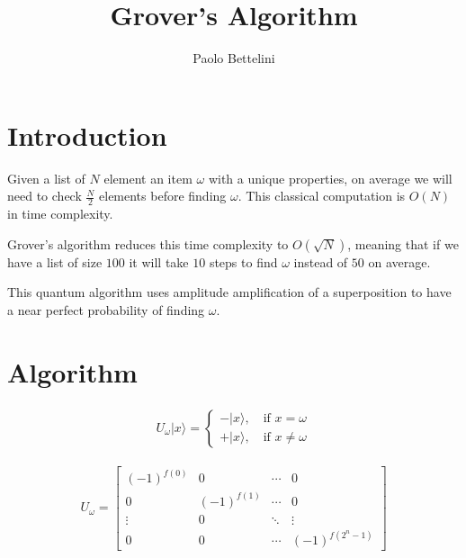 \documentclass{article}
\title{Grover's Algorithm}
\author{Paolo Bettelini}
\date{}
\begin{document}
\maketitle
\tableofcontents
\pagebreak

\section{Introduction}

Given a list of \(N\) element an item \(\omega\) with a unique properties, on average we will need to check \(\frac{N}{2}\) elements before finding \(\omega\).
This classical computation is \(O(N)\) in time complexity.

Grover's algorithm reduces this time complexity to \(O(\sqrt{N})\), meaning that if we have a list of size \(100\) it will take \(10\) steps to find \(\omega\) instead of \(50\) on average.

This quantum algorithm uses amplitude amplification of a superposition to have a near perfect probability of finding \(\omega\).

\pagebreak

\section{Algorithm}

\begin{align*}
    U_\omega|x\rangle=
    \begin{cases}
        -|x\rangle,\quad \text{if } x=\omega \\
        +|x\rangle,\quad \text{if } x\neq\omega
    \end{cases}
\end{align*}

\begin{align*}
    U_\omega=
    \begin{bmatrix}
        (-1)^{f(0)} & 0 & \cdots & 0 \\
        0 & (-1)^{f(1)} & \cdots & 0 \\
        \vdots & 0 & \ddots & \vdots \\
        0 & 0 & \cdots & (-1)^{f(2^n-1)}
    \end{bmatrix}
\end{align*}
\end{document}
